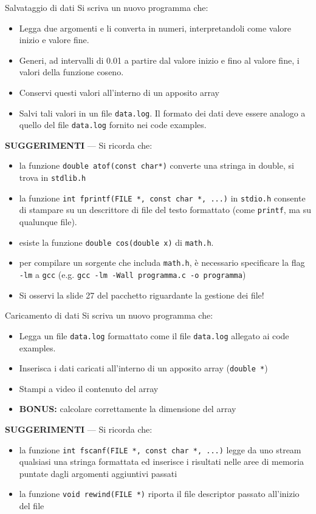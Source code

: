 \documentclass{beamer}
\begin{document}
\begin{frame}[fragile]{Salvataggio di dati}
Si scriva un nuovo programma che:
\begin{itemize}
 \item Legga due argomenti e li converta in numeri, interpretandoli come valore inizio e valore fine.
 \item Generi, ad intervalli di 0.01 a partire dal valore inizio e fino al valore fine, i valori della funzione coseno.
 \item Conservi questi valori all'interno di un apposito array
 \item Salvi tali valori in un file \texttt{data.log}. Il formato dei dati deve essere analogo a quello del file \texttt{data.log} fornito nei code examples.
\end{itemize}
\scriptsize
\textbf{SUGGERIMENTI} --- Si ricorda che:
\begin{itemize}
 \item la funzione \texttt{double atof(const char*)} converte una stringa in double, si trova in \texttt{stdlib.h}
 \item la funzione \texttt{int fprintf(FILE *, const char *, ...)} in \texttt{stdio.h} consente di stampare su un descrittore di file del testo formattato (come \texttt{printf}, ma su qualunque file).
 \item esiste la funzione \texttt{double cos(double x)} di \texttt{math.h}.
 \item per compilare un sorgente che includa \texttt{math.h}, è necessario specificare la flag \texttt{-lm} a \texttt{gcc} (e.g. \texttt{gcc -lm -Wall programma.c -o programma})
 \item Si osservi la slide 27 del pacchetto riguardante la gestione dei file!
\end{itemize}
\end{frame}

\begin{frame}[fragile]{Caricamento di dati}
Si scriva un nuovo programma che:
\begin{itemize}
 \item Legga un file \texttt{data.log} formattato come il file \texttt{data.log} allegato ai code examples.
 \item Inserisca i dati caricati all'interno di un apposito array (\texttt{double *})
 \item Stampi a video il contenuto del array
 \item \textbf{BONUS:} calcolare correttamente la dimensione del array
\end{itemize}
\scriptsize
\textbf{SUGGERIMENTI} --- Si ricorda che:
\begin{itemize}
 \item la funzione \texttt{int fscanf(FILE *, const char *, ...)} legge da uno stream qualsiasi una stringa formattata ed inserisce i risultati nelle aree di memoria puntate dagli argomenti aggiuntivi passati
 \item la funzione \texttt{void rewind(FILE *)} riporta il file descriptor passato all'inizio del file
\end{itemize}
\end{frame}
\end{document}
